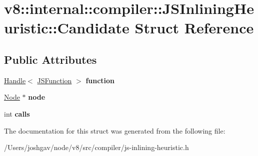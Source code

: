 \hypertarget{structv8_1_1internal_1_1compiler_1_1_j_s_inlining_heuristic_1_1_candidate}{}\section{v8\+:\+:internal\+:\+:compiler\+:\+:J\+S\+Inlining\+Heuristic\+:\+:Candidate Struct Reference}
\label{structv8_1_1internal_1_1compiler_1_1_j_s_inlining_heuristic_1_1_candidate}
\subsection*{Public Attributes}
\begin{DoxyCompactItemize}
\item 
\hyperlink{classv8_1_1internal_1_1_handle}{Handle}$<$ \hyperlink{classv8_1_1internal_1_1_j_s_function}{J\+S\+Function} $>$ {\bfseries function}\hypertarget{structv8_1_1internal_1_1compiler_1_1_j_s_inlining_heuristic_1_1_candidate_aac78aafd61763e0158216189af7e6ce8}{}\label{structv8_1_1internal_1_1compiler_1_1_j_s_inlining_heuristic_1_1_candidate_aac78aafd61763e0158216189af7e6ce8}

\item 
\hyperlink{classv8_1_1internal_1_1compiler_1_1_node}{Node} $\ast$ {\bfseries node}\hypertarget{structv8_1_1internal_1_1compiler_1_1_j_s_inlining_heuristic_1_1_candidate_add9b28b348099757b0df8556ef06ff65}{}\label{structv8_1_1internal_1_1compiler_1_1_j_s_inlining_heuristic_1_1_candidate_add9b28b348099757b0df8556ef06ff65}

\item 
int {\bfseries calls}\hypertarget{structv8_1_1internal_1_1compiler_1_1_j_s_inlining_heuristic_1_1_candidate_a1224f7d1cfc2ba6a2148b120ec3d7f5b}{}\label{structv8_1_1internal_1_1compiler_1_1_j_s_inlining_heuristic_1_1_candidate_a1224f7d1cfc2ba6a2148b120ec3d7f5b}

\end{DoxyCompactItemize}


The documentation for this struct was generated from the following file\+:\begin{DoxyCompactItemize}
\item 
/\+Users/joshgav/node/v8/src/compiler/js-\/inlining-\/heuristic.\+h\end{DoxyCompactItemize}
